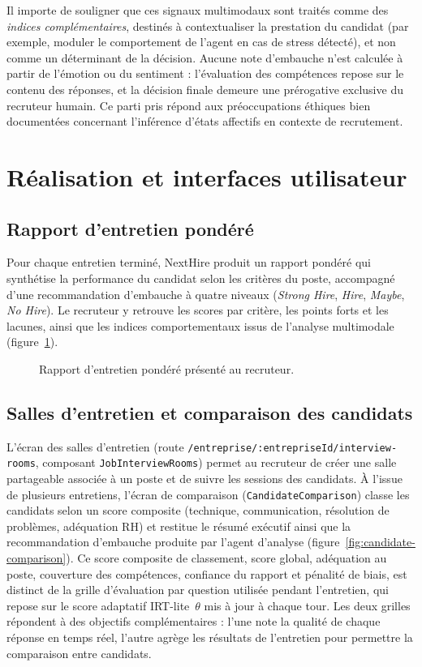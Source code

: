 Il importe de souligner que ces signaux multimodaux sont traités comme des \textit{indices complémentaires}, destinés à contextualiser la prestation du candidat (par exemple, moduler le comportement de l'agent en cas de stress détecté), et non comme un déterminant de la décision. Aucune note d'embauche n'est calculée à partir de l'émotion ou du sentiment : l'évaluation des compétences repose sur le contenu des réponses, et la décision finale demeure une prérogative exclusive du recruteur humain. Ce parti pris répond aux préoccupations éthiques bien documentées concernant l'inférence d'états affectifs en contexte de recrutement.

\section{Réalisation et interfaces utilisateur}

\subsection{Rapport d'entretien pondéré}

Pour chaque entretien terminé, NextHire produit un rapport pondéré qui synthétise la performance du candidat selon les critères du poste, accompagné d'une recommandation d'embauche à quatre niveaux (\textit{Strong Hire}, \textit{Hire}, \textit{Maybe}, \textit{No Hire}). Le recruteur y retrouve les scores par critère, les points forts et les lacunes, ainsi que les indices comportementaux issus de l'analyse multimodale (figure~\ref{fig:report}).

\begin{figure}[H]
  \centering
  \caption{Rapport d'entretien pondéré présenté au recruteur.}
  \label{fig:report}
\end{figure}

\subsection{Salles d'entretien et comparaison des candidats}

L'écran des salles d'entretien (route \texttt{/entreprise/:entrepriseId/interview-rooms},
composant \texttt{JobInterviewRooms}) permet au recruteur de créer une salle partageable
associée à un poste et de suivre les sessions des candidats. À l'issue de plusieurs entretiens,
l'écran de comparaison (\texttt{CandidateComparison}) classe les candidats selon un score
composite (technique, communication, résolution de problèmes, adéquation RH) et restitue le
résumé exécutif ainsi que la recommandation d'embauche produite par l'agent d'analyse
(figure~\ref{fig:candidate-comparison}).
Ce score composite de classement, score global, adéquation au poste, couverture des compétences, confiance du rapport et pénalité de biais, est distinct de la grille d'évaluation par question utilisée pendant l'entretien, qui repose sur le score adaptatif IRT-lite~$\theta$ mis à jour à chaque tour. Les deux grilles répondent à des objectifs complémentaires : l'une note la qualité de chaque réponse en temps réel, l'autre agrège les résultats de l'entretien pour permettre la comparaison entre candidats.

